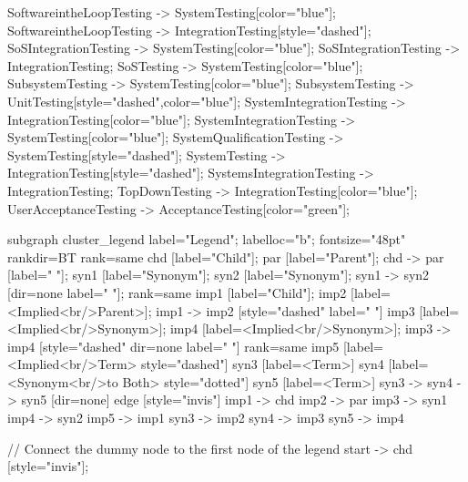\documentclass{article}
\begin{document}
{SoftwareintheLoopTesting -> SystemTesting[color="blue"];
SoftwareintheLoopTesting -> IntegrationTesting[style="dashed"];
SoSIntegrationTesting -> SystemTesting[color="blue"];
SoSIntegrationTesting -> IntegrationTesting;
SoSTesting -> SystemTesting[color="blue"];
SubsystemTesting -> SystemTesting[color="blue"];
SubsystemTesting -> UnitTesting[style="dashed",color="blue"];
SystemIntegrationTesting -> IntegrationTesting[color="blue"];
SystemIntegrationTesting -> SystemTesting[color="blue"];
SystemQualificationTesting -> SystemTesting[style="dashed"];
SystemTesting -> IntegrationTesting[style="dashed"];
SystemsIntegrationTesting -> IntegrationTesting;
TopDownTesting -> IntegrationTesting[color="blue"];
UserAcceptanceTesting -> AcceptanceTesting[color="green"];

subgraph cluster_legend {
    label="Legend";
    labelloc="b";
    fontsize="48pt"
    rankdir=BT
    {
        rank=same
        chd [label="Child"];
        par [label="Parent"];
        chd -> par [label="                "];
        syn1 [label="Synonym"];
        syn2 [label="Synonym"];
        syn1 -> syn2 [dir=none label="                "];
    }
    {
        rank=same
        imp1 [label="Child"];
        imp2 [label=<Implied<br/>Parent>];
        imp1 -> imp2 [style="dashed" label="                "]
        imp3 [label=<Implied<br/>Synonym>];
        imp4 [label=<Implied<br/>Synonym>];
        imp3 -> imp4 [style="dashed" dir=none label="                "]
    }
    {
        rank=same
        imp5 [label=<Implied<br/>Term> style="dashed"]
        syn3 [label=<Term>]
        syn4 [label=<Synonym<br/>to Both> style="dotted"]
        syn5 [label=<Term>]
        syn3 -> syn4 -> syn5 [dir=none]
    }
    edge [style="invis"]
    imp1 -> chd
    imp2 -> par
    imp3 -> syn1
    imp4 -> syn2
imp5 -> imp1
syn3 -> imp2
syn4 -> imp3
syn5 -> imp4
}

// Connect the dummy node to the first node of the legend
start -> chd [style="invis"];
}
\end{document}
